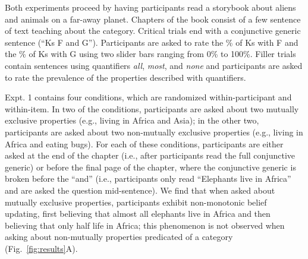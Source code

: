\documentclass[letterpaper, 12pt]{article}
\begin{document}

Both experiments proceed by having participants read a storybook about aliens and animals on a far-away planet. Chapters of the book consist of a few sentence of text teaching about the category. Critical trials end with a conjunctive generic sentence (``Ks F and G''). Participants are asked to rate the \% of Ks with F and the \% of Ks with G using two slider bars ranging from 0\% to 100\%. Filler trials contain sentences using quantifiers \emph{all}, \emph{most}, and \emph{none} and participants are asked to rate the prevalence of the properties described with quantifiers. 

Expt. 1 contains four conditions, which are randomized within-participant and within-item. In two of the conditions, participants are asked about two mutually exclusive properties (e.g., living in Africa and Asia); in the other two, participants are asked about two non-mutually exclusive properties (e.g., living in Africa and eating bugs). For each of these conditions, participants are either asked at the end of the chapter (i.e., after participants read the full conjunctive generic) or before the final page of the chapter, where the conjunctive generic is broken before the ``and'' (i.e., participants only read ``Elephants live in Africa'' and are asked the question mid-sentence). We find that when asked about mutually exclusive properties, participants exhibit non-monotonic belief updating, first believing that almost all elephants live in Africa and then believing that only half life in Africa; this phenomenon is not observed when asking about non-mutually properties predicated of a category (Fig.~\ref{fig:results}A).
\end{document}
